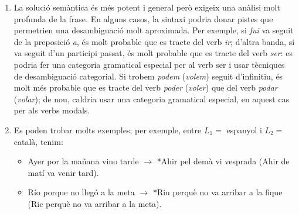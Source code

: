 \begin{enumerate}
      
      
      
\item La solució semàntica és més potent i general però exigeix una
  anàlisi molt profunda de la frase. En alguns casos, la sintaxi
  podria donar pistes que permetrien una desambiguació molt
  aproximada. Per exemple, si {\em fui\/} va seguit de la preposició
  {\em a}, és molt probable que es tracte del verb {\em ir}; d'altra
  banda, si va seguit d'un participi passat, és molt probable que es
  tracte del verb {\em ser\/}: es podria fer una categoria gramatical
  especial per al verb ser i usar tècniques de desambiguació
  categorial. Si trobem {\em podem\/} ({\em volem\/}) seguit
  d'infinitiu, és molt més probable que es tracte del verb {\em
    poder\/} ({\em voler\/}) que del verb {\em podar} ({\em volar\/});
  de nou, caldria usar una categoria gramatical especial, en aquest
  cas per als verbs modals.
     
\item Es poden trobar molts exemples; per exemple, entre $L_1 =$
  espanyol i $L_2 =$ català, tenim:
  \begin{itemize}
  \item Ayer por la mañana vino tarde $\rightarrow$ *Ahir pel demà vi
    vesprada (Ahir de matí va venir tard).
  \item Río porque no llegó a la meta $\rightarrow$ *Riu perquè no va
    arribar a la fique (Ric perquè no va arribar a la meta).
  \end{itemize}
      

\end{enumerate}
